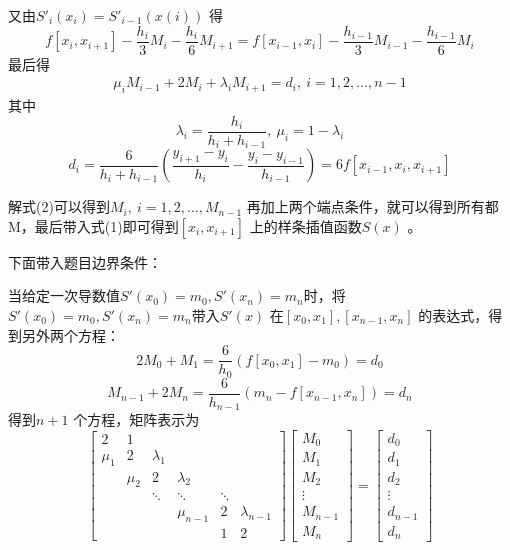 \documentclass[12pt,a4paper,utf8]{ctexart}
\begin{document}
\begin{enumerate}
又由$ S'_i(x_i)=S'_{i-1}(x(i)) $ 得
$$ f[x_i,x_{i+1}]-\frac{h_i}{3} M_i-\frac{h_i}{6} M_{i+1} = f[x_{i-1},x_{i}]-\frac{h_{i-1}}{3} M_{i-1}-\frac{h_{i-1}}{6} M_{i} $$ 
最后得
\begin{align}
   \mu_i M_{i-1}+2M_i+\lambda_i M_{i+1} = d_i , \ i=1,2,...,n-1 
\end{align}
其中
$$ \lambda_i = \frac{h_i}{h_i+h_{i-1}} , \ \mu_i=1-\lambda_i $$
$$ d_i = \frac{6}{h_i+h_{i-1}} (\frac{y_{i+1}-y_i}{h_i} - \frac{y_i-y_{i-1}}{h_{i-1}}) =6f[x_{i-1},x_i,x_{i+1}] $$

解式(2)可以得到$ M_i, \ i=1,2,...,M_{n-1} $ 再加上两个端点条件，就可以得到所有都M，最后带入式(1)即可得到$ [x_i,x_{i+1}] $ 上的样条插值函数$ S(x) $ 。

下面带入题目边界条件：

当给定一次导数值$S'(x_0)=m_0,S'(x_n)=m_n$时，将$S'(x_0)=m_0,S'(x_n)=m_n$带入$ S'(x) $ 在$ [x_0,x_1],[x_{n-1},x_n] $ 的表达式，得到另外两个方程：
$$ 2M_0+M_1 = \frac{6}{h_0} (f[x_0,x_1]-m_0)=d_0 $$
$$ M_{n-1}+2M_n = \frac{6}{h_{n-1}} (m_n-f[x_{n-1},x_n])=d_n $$
得到$ n+1 $ 个方程，矩阵表示为
\begin{equation}
   \left[
   \begin{array}{cccccccccccc}
    2    & 1 \\
    \mu_1& 2      & \lambda_1 \\
      \  & \mu_2  & 2      & \lambda_2 \\
      \  &   \    & \ddots & \ddots & \ddots \\
      \  &   \    &   \    & \mu_{n-1} & 2   &\lambda_{n-1} \\
      \  &   \    &   \    &     \     & 1   &2
   \end{array}
   \right ]
   \left[
   \begin{array}{cccc}
    M_{0}\\
    M_{1}\\
    M_{2}\\
    \vdots \\
    M_{n-1}\\
    M_{n}
   \end{array}
   \right ]
   =
   \left[
   \begin{array}{cccc}
      d_{0}\\
      d_{1}\\
      d_{2}\\
      \vdots \\
      d_{n-1}\\
      d_{n}
   \end{array}
   \right ]
   \end{equation}


\end{enumerate}
\end{document}
